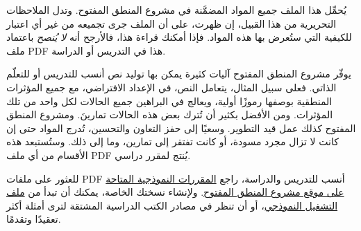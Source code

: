 \documentclass[../include/open-logic-part]{subfiles}
\begin{document}
\clearpage

\begin{editorial}
يُحمِّل هذا الملف جميع المواد المضمَّنة في مشروع المنطق المفتوح.
وتدل الملاحظات التحريرية من هذا القبيل، إن ظهرت، على أن الملف جرى
تجميعه من غير أي اعتبار للكيفية التي ستُعرض بها هذه المواد. فإذا أمكنك
قراءة هذا، فالأرجح أنه \emph{لا يُنصح} باعتماد ملف PDF هذا في التدريس
أو الدراسة.

يوفّر مشروع المنطق المفتوح آليات كثيرة يمكن بها توليد نص أنسب للتدريس
أو للتعلّم الذاتي. فعلى سبيل المثال، يتعامل النص، في الإعداد الافتراضي،
مع جميع المؤثرات المنطقية بوصفها رموزًا أولية، ويعالج في البراهين جميع
الحالات لكل واحد من تلك المؤثرات. ومن الأفضل بكثير أن تُترك بعض هذه الحالات
تمارينَ. ومشروع المنطق المفتوح كذلك عمل قيد التطوير. وسعيًا إلى حفز
التعاون والتحسين، تُدرج المواد حتى إن كانت لا تزال مجرد مسودة، أو كانت
تفتقر إلى تمارين، وما إلى ذلك. وستُستبعد هذه الأقسام من أي ملف PDF
يُنتج لمقرر دراسي.

للعثور على ملفات PDF أنسب للتدريس والدراسة، راجع
\href{http://builds.openlogicproject.org/}{المقررات النموذجية
  المتاحة على موقع مشروع المنطق المفتوح}. ولإنشاء نسختك الخاصة، يمكنك
أن تبدأ من
\href{https://github.com/OpenLogicProject/OpenLogic/tree/master/courses/sample}{ملف
  التشغيل النموذجي}، أو أن تنظر في مصادر الكتب الدراسية المشتقة لترى
أمثلة أكثر تعقيدًا وتقدمًا.
\end{editorial}


















\end{document}
